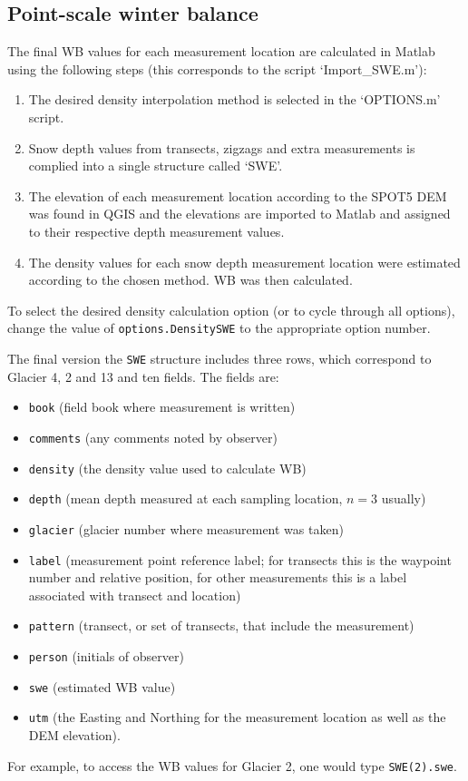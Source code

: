 \documentclass{sfuthesis}
\begin{document}
{\begin{appendices}
\section{Point-scale winter balance}

The final WB values for each measurement location are calculated in Matlab using the following steps (this corresponds to the script `Import\_SWE.m'):
\begin{enumerate}
\item The desired density interpolation method is selected in the `OPTIONS.m' script.
\item Snow depth values from transects, zigzags and extra measurements is complied into a single structure called `SWE'.
\item The elevation of each measurement location according to the SPOT5 DEM was found in QGIS and the elevations are imported to Matlab and assigned to their respective depth measurement values.
\item The density values for each snow depth measurement location were estimated according to the chosen method. WB was then calculated. 
\end{enumerate}
To select the desired density calculation option (or to cycle through all options), change the value of \texttt{options.DensitySWE} to the appropriate option number.

The final version the \texttt{SWE} structure includes three rows, which correspond to Glacier 4, 2 and 13 and ten fields. The fields are: 
\begin{itemize}
\item \texttt{book} (field book where measurement is written)
\item \texttt{comments} (any comments noted by observer)
\item \texttt{density} (the density value used to calculate WB)
\item \texttt{depth} (mean depth measured at each sampling location, $n=3$ usually)
\item \texttt{glacier} (glacier number where measurement was taken)
\item \texttt{label} (measurement point reference label; for transects this is the waypoint number and relative position, for other measurements this is a label associated with transect and location)
\item \texttt{pattern} (transect, or set of transects, that include the measurement)
\item \texttt{person} (initials of observer)
\item \texttt{swe} (estimated WB value)
\item \texttt{utm} (the Easting and Northing for the measurement location as well as the DEM elevation). 
\end{itemize}
For example, to access the WB values for Glacier 2, one would type \texttt{SWE(2).swe}. 


\end{appendices}}
\end{document}
